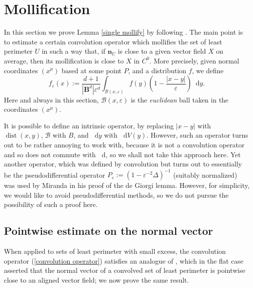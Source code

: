 \documentclass[reqno,11pt]{amsart}
\newcommand{\Ball}{\mathbf{B}}
\newcommand*\dif{\mathop{}\!\mathrm{d}}
\DeclareMathOperator{\dist}{dist}
\newcommand{\normal}{\mathbf n}
\theoremstyle{definition}
\numberwithin{equation}{section}
\begin{document}
\section{Mollification} \label{Mollifiers}
In this section we prove Lemma \ref{single mollify} by following \cite[Chapter 7]{Giusti77}.
The main point is to estimate a certain convolution operator which mollifies the set of least perimeter $U$ in such a way that, if $\normal_U$ is close to a given vector field $X$ on average, then its mollification is close to $X$ in $C^0$.
More precisely, given normal coordinates $(x^\mu)$ based at some point $P$, and a distribution $f$, we define 
\begin{equation}\label{convolution operator}
f_\varepsilon(x) := \frac{d + 1}{|\Ball^d| \varepsilon^d} \int_{\mathcal B(x, \varepsilon)} f(y) \left(1 - \frac{|x - y|}{\varepsilon}\right) \dif y.
\end{equation}
Here and always in this section, $\mathcal B(x, \varepsilon)$ is the \emph{euclidean} ball taken in the coordinates $(x^\mu)$.

It is possible to define an intrinsic operator, by replacing $|x - y|$ with $\dist(x, y)$, $\mathcal B$ with $B$, and $\dif y$ with $\dif V(y)$.
However, such an operator turns out to be rather annoying to work with, because it is not a convolution operator and so does not commute with $\dif$, so we shall not take this approach here.
Yet another operator, which was defined by convolution but turns out to essentially be the pseudodifferential operator $P_\varepsilon := (1 - \varepsilon^{-2} \Delta)^{-1}$ (suitably normalized) was used by Miranda \cite[\S5]{Miranda66} in his proof of the de Giorgi lemma.
However, for simplicity, we would like to avoid pseudodifferential methods, so we do not pursue the possibility of such a proof here.

\subsection{Pointwise estimate on the normal vector}
When applied to sets of least perimeter with small excess, the convolution operator (\ref{convolution operator}) satisfies an analogue of \cite[Theorem 7.3]{Giusti77}, which in the flat case asserted that the normal vector of a convolved set of least perimeter is pointwise close to an aligned vector field; we now prove the same result.
\end{document}
